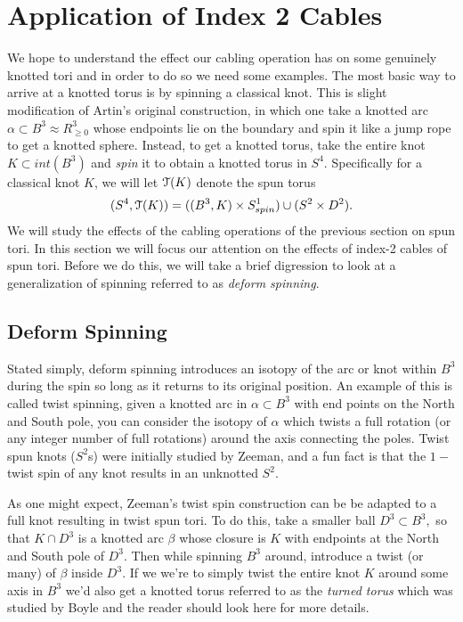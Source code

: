 \documentclass[a4paper, 12 pt, reqno]{amsart}
\theoremstyle{definition}
\theoremstyle{remark}
\begin{document}
\section{Application of Index 2 Cables} 
We hope to understand the effect our cabling operation has on some genuinely knotted tori and in order to do so we need some examples. The most basic way to arrive at a knotted torus is by spinning a classical knot. This is slight modification of Artin's original construction, in which one take a knotted arc $\alpha \subset B^{3} \approx R^{3}_{\geq 0}$ whose endpoints lie on the boundary and spin it like a jump rope to get a knotted sphere. Instead, to get a knotted torus, take the entire knot $K \subset int(B^{3}) $ and {\em spin} it to obtain a knotted torus in $S^{4}.$ Specifically for a classical knot $K$, we will let $\mathcal T(K)$ denote the spun torus $$(S^{4}, \mathcal T(K)) = ((B^{3}, K) \times S^{1}_{spin}) \cup (S^{2} \times D^{2}).$$ We will study the effects of the cabling operations of the previous section on spun tori. In this section we will focus our attention on the effects of index-2 cables of spun tori. Before we do this, we will take a brief digression to look at a generalization of spinning referred to as \textit{deform spinning}. 

\subsection{Deform Spinning}
Stated simply, deform spinning introduces an isotopy of the arc or knot within $B^{3}$ during the spin so long as it returns to its original position. An example of this is called twist spinning, given a knotted arc in $\alpha \subset B^{3}$ with end points on the North and South pole, you can consider the isotopy of $\alpha$ which twists a full rotation (or any integer number of full rotations) around the axis connecting the poles. Twist spun knots ($S^{2}$s) were initially studied by Zeeman, and a fun fact is that the $1-$twist spin of any knot results in an unknotted $S^{2}.$


As one might expect, Zeeman's twist spin construction can be be adapted to a full knot resulting in twist spun tori. To do this, take a smaller ball $D^{3} \subset B^{3},$ so that $K \cap D^{3}$ is a knotted arc $\beta$ whose closure is $K$ with endpoints at the North and South pole of $D^{3}.$ Then while spinning $B^{3}$ around, introduce a twist (or many) of $\beta$ inside $D^{3}.$ If we we're to simply twist the entire knot $K$ around some axis in $B^{3}$ we'd also get a knotted torus referred to as the \textit{turned torus} which was studied by Boyle and the reader should look here for more details.
\end{document}
